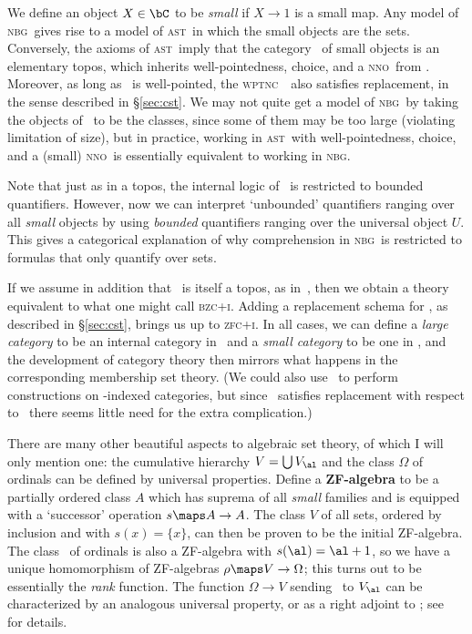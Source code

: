 \documentclass{amsart}
\def\zfci{\textsc{zfc+i}}
\def\zfcs{\textsc{zfc/s}}
\def\zmcs{\textsc{zmc/s}}
\def\nbg{\textsc{nbg}}
\def\wptnc{\textsc{wptnc}}
\def\bzci{\textsc{bzc+i}}
\def\nno{\textsc{nno}}
\def\ast{\textsc{ast}}
\begin{document}
We define an object $X\in\bC$ to be \emph{small} if $X\to 1$ is a
small map.  Any model of \nbg\ gives rise to a model of \ast\ in which
the small objects are the sets.  Conversely, the axioms of \ast\ imply
that the category \bS\ of small objects is an elementary topos, which
inherits well-pointedness, choice, and a \nno\ from \bC.  Moreover, as
long as \bC\ is well-pointed, the \wptnc\ \bS\ also satisfies
replacement, in the sense described in \S\ref{sec:cst}.  We may not
quite get a model of \nbg\ by taking the objects of \bC\ to be the
classes, since some of them may be too large (violating limitation of
size), but in practice, working in \ast\ with well-pointedness,
choice, and a (small) \nno\ is essentially equivalent to working in
\nbg.

Note that just as in a topos, the internal logic of \bC\ is restricted
to bounded quantifiers.  However, now we can interpret `unbounded'
quantifiers ranging over all \emph{small} objects by using
\emph{bounded} quantifiers ranging over the universal object $U$.
This gives a categorical explanation of why comprehension in \nbg\ is
restricted to formulas that only quantify over sets.

If we assume in addition that \bC\ is itself a topos, as
in~\cite{streicher:universes}, then we obtain a theory equivalent to
what one might call \bzci.  Adding a replacement schema for \bC, as
described in \S\ref{sec:cst}, brings us up to \zfci.  In all cases, we
can define a \emph{large category} to be an internal category in \bC\
and a \emph{small category} to be one in \bS, and the development of
category theory then mirrors what happens in the corresponding
membership set theory.  (We could also use \bC\ to perform
constructions on \bS-indexed categories, but since \bS\ satisfies
replacement with respect to \bC\ there seems little need for the extra
complication.)


There are many other beautiful aspects to algebraic set theory, of
which I will only mention one: the cumulative hierarchy $V=\bigcup
V_\al$ and the class $\Omega$ of ordinals can be defined by universal
properties.  Define a \textbf{ZF-algebra} to be a partially ordered
class $A$ which has suprema of all \emph{small} families and is
equipped with a `successor' operation $s\maps A\to A$.  The class $V$
of all sets, ordered by inclusion and with $s(x) = \{x\}$, can then be
proven to be the initial ZF-algebra.  The class \Omega\ of ordinals is
also a ZF-algebra with $s(\al) = \al+1$, so we have a unique
homomorphism of ZF-algebras $\rho\maps V\to\Omega$; this turns out to
be essentially the \emph{rank} function.  The function $\Omega\to V$
sending \al\ to $V_\al$ can be characterized by an analogous universal
property, or as a right adjoint to \rho; see~\cite{jm:ast} for
details.
\end{document}
